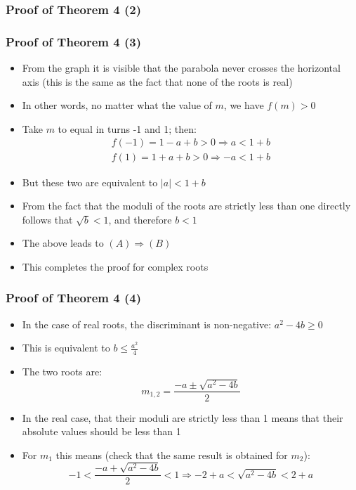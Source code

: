 \documentclass[10pt,usenames,dvipsnames]{beamer}
\theoremstyle{definition}
\begin{document}
\begin{frame}[fragile]
\frametitle{Proof of Theorem 4 (2)}
\begin{center}
\end{center} 
\end{frame}

\begin{frame}[fragile]
\frametitle{Proof of Theorem 4 (3)}
\begin{itemize}
	\item From the graph it is visible that the parabola never crosses the horizontal axis (this is the same as the fact that none of the roots is real)
	\item In other words, no matter what the value of $m$, we have $f(m) > 0$
	\item Take $m$ to equal in turns -1 and 1; then:
	\[
		\begin{array}{lcl}
			f(-1) = 1 - a + b > 0 \Rightarrow a < 1 + b\\
			f(1) = 1 + a + b > 0 \Rightarrow -a < 1 + b
		\end{array}
	\]
	\item But these two are equivalent to $|a| < 1 + b$
	\item From the fact that the moduli of the roots are strictly less than one directly follows that $\sqrt{b} < 1$, and therefore $b < 1$
	\item The above leads to $(A) \Rightarrow (B)$
	\item This completes the proof for complex roots
\end{itemize}
\end{frame}

\begin{frame}[fragile]
\frametitle{Proof of Theorem 4 (4)}
\begin{itemize}
	\item In the case of real roots, the discriminant is non-negative: $a^{2} - 4b \geq 0$
	\item This is equivalent to $\displaystyle b \leq \frac{a^{2}}{4}$
	\item The two roots are:
	\[
		m_{1,2} = \frac{-a \pm \sqrt{a^{2} - 4b}}{2}
	\]
	\item In the real case, that their moduli are strictly less than 1 means that their absolute values should be less than 1
	\item For $m_{1}$ this means (check that the same result is obtained for $m_{2}$):
	\[
		-1 < \frac{-a + \sqrt{a^{2} - 4b}}{2} < 1 \Rightarrow -2 + a < \sqrt{a^{2} - 4b} < 2 + a
	\]	
\end{itemize}
\end{frame}
\end{document}
